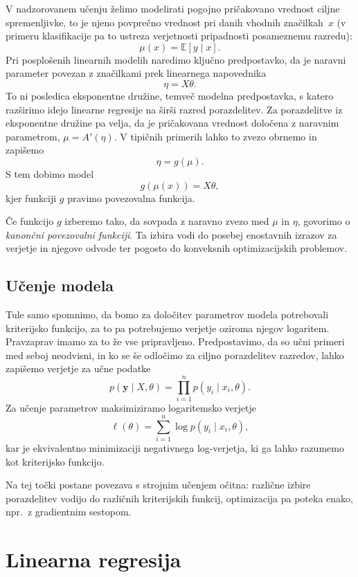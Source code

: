 V nadzorovanem učenju želimo modelirati pogojno pričakovano vrednost ciljne spremenljivke, to je njeno povprečno vrednost pri danih vhodnih značilkah~$x$ (v primeru klasifikacije pa to ustreza verjetnosti pripadnosti posameznemu razredu):
\[
\mu(x) = \mathbb{E}[y \mid x].
\]
Pri posplošenih linearnih modelih naredimo ključno predpostavko, da je naravni parameter povezan z značilkami prek linearnega napovednika
\[
\eta = X\theta.
\]
To ni posledica eksponentne družine, temveč modelna predpostavka, s katero razširimo idejo linearne regresije na širši razred porazdelitev. Za porazdelitve iz eksponentne družine pa velja,
%
%
da je pričakovana vrednost določena z naravnim parametrom, $\mu = A'(\eta)$. V tipičnih primerih lahko to zvezo obrnemo in zapišemo
\[
\eta = g(\mu).
\]
S tem dobimo model
\[
g(\mu(x)) = X\theta,
\]
kjer funkciji $g$ pravimo povezovalna funkcija.

Če funkcijo $g$ izberemo tako, da sovpada z naravno zvezo med $\mu$ in $\eta$, govorimo o \emph{kanončni povezovalni funkciji}. Ta izbira vodi do posebej enostavnih izrazov za verjetje in njegove odvode ter pogosto do konveksnih optimizacijskih problemov.


\subsection{Učenje modela}

Tule samo spomnimo, da bomo za določitev parametrov modela potrebovali kriterijsko funkcijo, za to pa potrebujemo verjetje oziroma njegov logaritem. Pravzaprav imamo za to že vse pripravljeno. Predpostavimo, da so učni primeri med seboj neodvisni, in ko se še odločimo za ciljno  porazdelitev razredov, lahko zapišemo verjetje za učne podatke
\[
p(\mathbf{y} \mid X, \theta) = \prod_{i=1}^n p(y_i \mid x_i, \theta).
\]
Za učenje parametrov maksimiziramo logaritemsko verjetje
\[
\ell(\theta) = \sum_{i=1}^n \log p(y_i \mid x_i, \theta),
\]
kar je ekvivalentno minimizaciji negativnega log-verjetja, ki ga lahko razumemo kot kriterijsko funkcijo.

Na tej točki postane povezava s strojnim učenjem očitna: različne izbire porazdelitev vodijo do različnih kriterijskih funkcij, optimizacija pa poteka enako, npr.\ z gradientnim sestopom.

\section{Linearna regresija}

